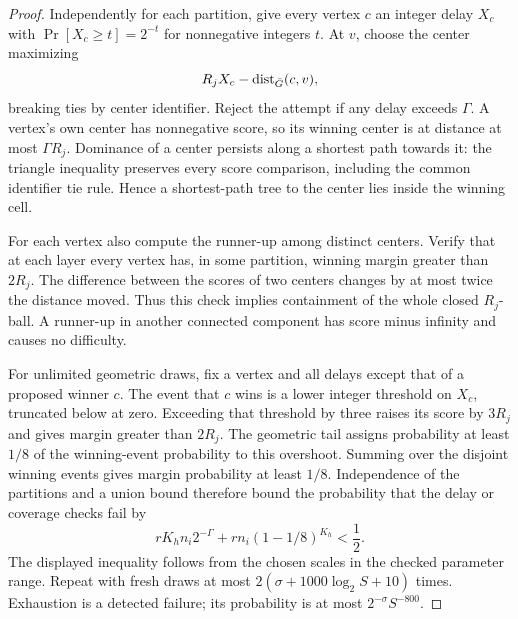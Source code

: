 \begin{proof}
Independently for each partition, give every vertex $c$ an integer delay
$X_c$ with $\Pr[X_c\ge t]=2^{-t}$ for nonnegative integers $t$.
At $v$, choose the center maximizing
\begin{equation}
\label{back:shifted-score}
                        R_jX_c-\operatorname{dist}_{\bar G}(c,v),
\end{equation}
breaking ties by center identifier.  Reject the attempt if any delay
exceeds $\Gamma$.  A vertex's own center has nonnegative score, so its
winning center is at distance at most $\Gamma R_j$.  Dominance of a
center persists along a shortest path towards it: the triangle
inequality preserves every score comparison, including the common
identifier tie rule.  Hence a shortest-path tree to the center lies
inside the winning cell.

For each vertex also compute the runner-up among distinct centers.
Verify that at each layer every vertex has, in some partition, winning
margin greater than $2R_j$.  The difference between the scores of two
centers changes by at most twice the distance moved.  Thus this check
implies containment of the whole closed $R_j$-ball.  A runner-up in
another connected component has score minus infinity and causes no
difficulty.

For unlimited geometric draws, fix a vertex and all delays except that
of a proposed winner $c$.  The event that $c$ wins is a lower integer
threshold on $X_c$, truncated below at zero.  Exceeding that threshold
by three raises its score by $3R_j$ and gives margin greater than
$2R_j$.  The geometric tail assigns probability at least $1/8$ of the
winning-event probability to this overshoot.  Summing over the disjoint
winning events gives margin probability at least $1/8$.  Independence
of the partitions and a union bound therefore bound the probability
that the delay or coverage checks fail by
\begin{equation}
\label{back:cover-failure}
       rK_hn_i2^{-\Gamma}+rn_i(1-1/8)^{K_h}<\frac12.
\end{equation}
The displayed inequality follows from the chosen scales in the checked
parameter range.  Repeat with fresh draws at most
$2(\sigma+1000\log_2 S+10)$ times.  Exhaustion is a detected failure;
its probability is at most $2^{-\sigma}S^{-800}$.


\end{proof}
